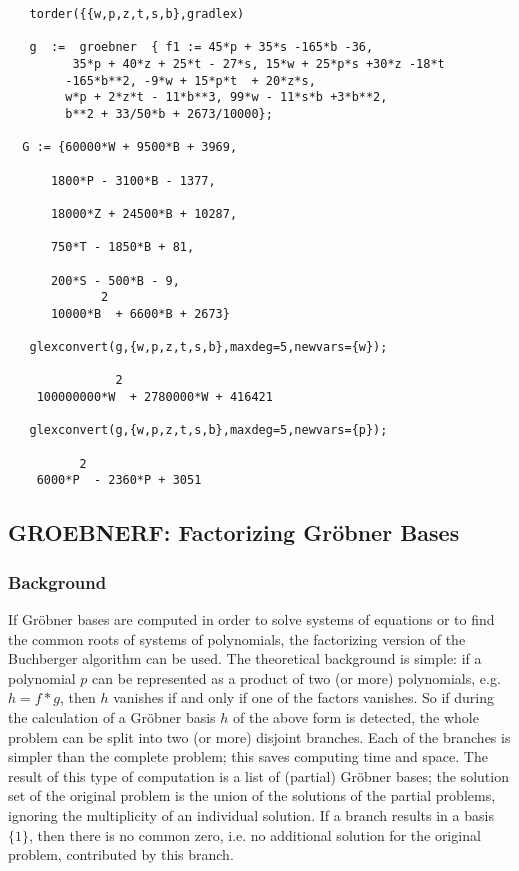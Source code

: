 \begin{verbatim}
   torder({{w,p,z,t,s,b},gradlex)

   g  :=  groebner  { f1 := 45*p + 35*s -165*b -36,
         35*p + 40*z + 25*t - 27*s, 15*w + 25*p*s +30*z -18*t
        -165*b**2, -9*w + 15*p*t  + 20*z*s,
        w*p + 2*z*t - 11*b**3, 99*w - 11*s*b +3*b**2,
        b**2 + 33/50*b + 2673/10000};

  G := {60000*W + 9500*B + 3969,

      1800*P - 3100*B - 1377,

      18000*Z + 24500*B + 10287,

      750*T - 1850*B + 81,

      200*S - 500*B - 9,
             2
      10000*B  + 6600*B + 2673}

   glexconvert(g,{w,p,z,t,s,b},maxdeg=5,newvars={w});

               2
    100000000*W  + 2780000*W + 416421

   glexconvert(g,{w,p,z,t,s,b},maxdeg=5,newvars={p});

          2
    6000*P  - 2360*P + 3051

\end{verbatim}

\subsection{GROEBNERF: Factorizing Gr\"obner Bases}

\subsubsection{Background}
If Gr\"obner bases are computed in order to solve systems of
equations or to find the common roots of systems of polynomials,
the factorizing version of the Buchberger algorithm can be used.
The theoretical background is simple: if a polynomial $p$ can be
represented as a product of two (or more) polynomials, e.g. $h= f*g$,
then $h$ vanishes if and only if one of the factors vanishes. So if
during the calculation of a Gr\"obner basis $h$ of the above form is
detected, the whole problem can be split into two (or more)
disjoint branches. Each of the branches is simpler than the complete
problem; this saves computing time and space. The result of this
type of computation is a list of (partial) Gr\"obner bases; the
solution set of the original problem is the union of the solutions of
the partial problems, ignoring the multiplicity of an individual
solution. If a branch results in a basis $\{1\}$, then there is no
common zero, i.e. no additional solution for the original problem,
contributed by this branch.

